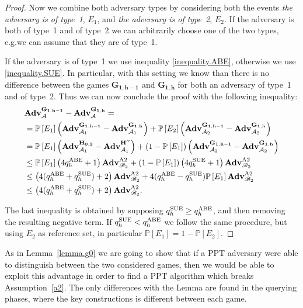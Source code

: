 \documentclass[a4paper,10pt]{article}
\newcommand{\prob}[1]{\mathbb{P}\left[#1\right]}
\newcommand{\adv}{\textbf{Adv}}
\newcommand{\game}[2]{$\mathbf{#1_{#2}}$}
\newcommand{\mathgame}[2]{\mathbf{#1_{#2}}}
\newcommand{\typeone}{type~1}
\newcommand{\typetwo}{type~2}
\begin{document}
\begin{proof}
		Now we combine both adversary types by considering both the events \textit{the adversary is of \typeone{}}, $E_1$, and \textit{the adversary is of \typetwo{}}, $E_2$. If the adversary is both of \typeone{} and of \typetwo{} we can arbitrarily choose one of the two types, e.g.\@ we can assume that they are of \typeone{}.
		
		If the adversary is of \typeone{} we use inequality \ref{inequality.ABE}, otherwise we use \ref{inequality.SUE}. In particular, with this setting we know than there is no difference between the games \game{G}{1,h-1} and \game{G}{1,h} for both an adversary of \typeone{} and of \typetwo{}.
		Thus we can now conclude the proof with the following inequality:
		\begin{align*}
			&\adv{}_\mathcal{A}^\mathgame{G}{1,h-1}-\adv{}_\mathcal{A}^\mathgame{G}{1,h} = \\
			&= \prob{E_1}\left(\adv{}_{\mathcal{A}_1}^\mathgame{G}{1,h-1}-\adv{}_{\mathcal{A}_1}^\mathgame{G}{1,h}\right) + \prob{E_2}\left(\adv{}_{\mathcal{A}_2}^\mathgame{G}{1,h-1}-\adv{}_{\mathcal{A}_2}^\mathgame{G}{1,h}\right) \\
			&= \prob{E_1}\left(\adv{}_{\mathcal{A}_1}^\mathgame{H}{0,2}-\adv{}_{\mathcal{A}_1}^\mathgame{H^{\prime\prime}}{}\right) + (1-\prob{E_1})\left(\adv{}_{\mathcal{A}_2}^\mathgame{G}{1,h-1}-\adv{}_{\mathcal{A}_2}^\mathgame{G}{1,h}\right)\\
			&\leq \prob{E_1}\left(4q_h^\textnormal{ABE}+1\right)\adv_{\mathscr{B}_2}^{\textnormal{A2}} + (1-\prob{E_1})\left(4q_h^\textnormal{SUE}+1\right)\adv_{\mathscr{B}_2}^{\textnormal{A2}} \\	
			&\leq \left(4(q_h^\textnormal{ABE}+q_h^\textnormal{SUE})+2\right)\adv_{\mathscr{B}_2}^{\textnormal{A2}} +4(q_h^\textnormal{ABE}-q_h^\textnormal{SUE})\prob{E_1}\adv_{\mathscr{B}_2}^{\textnormal{A2}}\\
			&\leq \left(4(q_h^\textnormal{ABE}+q_h^\textnormal{SUE})+2\right)\adv_{\mathscr{B}_2}^{\textnormal{A2}}.
		\end{align*}
		
		The last inequality is obtained by supposing $q_h^\textnormal{SUE}\geq q_h^\textnormal{ABE}$, and then removing the resulting negative term. If $q_h^\textnormal{SUE}< q_h^\textnormal{ABE}$ we follow the same procedure, but using $E_2$ as reference set, in particular $\prob{E_1}=1-\prob{E_2}$.
	\end{proof}
	
	As in Lemma~\ref{lemma.g0} we are going to show that if a PPT adversary were able to distinguish between the two considered games, then we would be able to exploit this advantage in order to find a PPT algorithm which breaks Assumption~\ref{a2}.
	The only differences with the Lemma are found in the querying phases, where the key constructions is different between each game.
		
\end{document}
